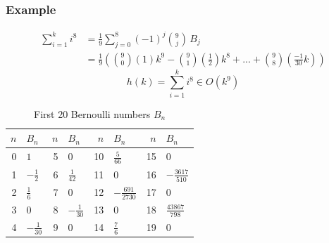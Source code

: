 \documentclass[9pt]{extarticle}
\begin{document}
\subsubsection*{Example}
\begin{align*}
    \sum_{i=1}^{k} i^8 &= \frac{1}{9}\sum_{j=0}^{8} (-1)^j \binom{9}{j}\, B_j\\
    &= \frac{1}{9}(\binom{9}{0}(1)k^9 - \binom{9}{1}(\frac{1}{2})k^8 + ... + \binom{9}{8}(\frac{-1}{30}k))
\end{align*}
\[h(k) = \sum_{i=1}^{k}i^8 \in O(k^9)\]
\begin{table}[h!]\centering
    \renewcommand{\arraystretch}{1.1}
    \setlength{\tabcolsep}{6pt}
    \begin{tabular}{r l r l r l r l}
    $n$ & $B_n$ & $n$ & $B_n$ & $n$ & $B_n$ & $n$ & $B_n$ \\\hline
    0  & $1$              & 5  & $0$                   & 10 & $\tfrac{5}{66}$        & 15 & $0$ \\
    1  & $-\tfrac{1}{2}$  & 6  & $\tfrac{1}{42}$       & 11 & $0$                    & 16 & $-\tfrac{3617}{510}$ \\
    2  & $\tfrac{1}{6}$   & 7  & $0$                   & 12 & $-\tfrac{691}{2730}$   & 17 & $0$ \\
    3  & $0$              & 8  & $-\tfrac{1}{30}$      & 13 & $0$                    & 18 & $\tfrac{43867}{798}$ \\
    4  & $-\tfrac{1}{30}$ & 9  & $0$                   & 14 & $\tfrac{7}{6}$         & 19 & $0$ \\
    \hline
    \end{tabular}
    \caption{First 20 Bernoulli numbers $B_n$}
    \end{table}
    
\end{document}
